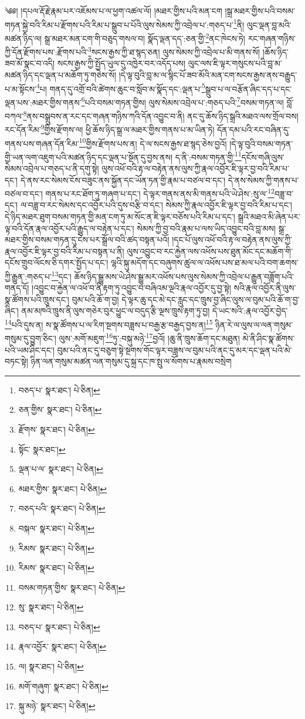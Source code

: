 \setcounter{footnote}{0} 
༄༅། །དཔལ་རྡོ་རྗེ་རྣམ་པར་འཇོམས་པ་ལ་ཕྱག་འཚལ་ལོ། །མཐར་གྱིས་པའི་མན་ངག །སྒྲ་མཐར་གྱིས་པའི་བསམ་གཏན་སྐྱེ་བའི་རིམ་པ་རྫོགས་པའི་རིམ་པ་སྒྲུབ་པ་པོའི་ལུས་སེམས་ཀྱི་འབྲེལ་པ་:གཅད་པ་\footnote{བཅད་པ་  སྣར་ཐང་།  པེ་ཅིན། }ནི། ལུང་ལྡན་བླ་མའི་མཚན་ཉིད་ལ། སྒྲ་མཐར་མན་ངག་གི་བཅུད་གསལ་བ། སྣོད་ལྡན་དད་:ཅན་གྱི་\footnote{ཅན་གྱིས་  སྣར་ཐང་།  པེ་ཅིན། }ནང་ཁེངས་ཏེ། རང་གཞན་གཉིས་ཀྱི་དོན་རྫོགས་པས་:རྫོགས་པའི་\footnote{རྫོགས་  སྣར་ཐང་།  པེ་ཅིན། }སངས་རྒྱས་ཀྱི་ཐ་སྙད་ཅན། ལུས་སེམས་ཀྱི་འབྲེལ་པ་མི་གནས་སོ། །ཆོས་ཉིད་ཟབ་མོ་སྣང་བ་འདི། སངས་རྒྱས་ཀྱི་སྤྱོད་ཡུལ་དུ་འཁྱེར་བར་འདོད་པས། ལུང་ལས་ཇི་ལྟར་གསུངས་པའི་བླ་མ་མཚན་ཉིད་དང་ལྡན་པ་མཆོག་ཏུ་གཅེས་སོ། །དེ་ལྟ་བུའི་བླ་མ་ལ་སྙིང་པོ་ཟབ་མོའི་མན་ངག་སངས་རྒྱས་ནས་བརྒྱུད་པ་མ་སྟོངས་\footnote{སྟོང་  སྣར་ཐང་། }པ། གནད་དུ་འགྲོ་བའི་ཚེགས་ཆུང་བ་སློབ་མ་སྣོད་དང་:ལྡན་པ་\footnote{ལྡན་པ་ལ་  སྣར་ཐང་།  པེ་ཅིན། }སྒྲུབ་པ་ལ་བརྩོན་ཞིང་དད་པ་དང་ལྡན་པས་:མཐར་གྱིས་གནས་\footnote{མཐར་གྱིས་  སྣར་ཐང་།  པེ་ཅིན། }པའི་བསམ་གཏན་གྱིས། ལུས་སེམས་འབྲེལ་པ་:གཅད་པའི་\footnote{བཅད་པའི་  སྣར་ཐང་།  པེ་ཅིན། }བསམ་གཏན་ལ། བློ་བཀལ་\footnote{བསྐལ་  སྣར་ཐང་།  པེ་ཅིན། }ནས་བསྒྲུབས་ན་རང་དང་གཞན་གཉིས་ཀའི་དོན་འབྱུང་བ་ནི། ནང་དུ་ཆོས་ཉིད་སྒྲའི་མཐའ་ལས་གྲོལ་བས། རང་དོན་རིམ་\footnote{རིམས་  སྣར་ཐང་།  པེ་ཅིན། }གྱིས་རྫོགས་ལ། ཕྱི་ཆོས་ཉིད་སྒྲ་ལ་མཐར་གྱིས་གནས་པ་མ་ཡིན་ཏེ། དོན་དམ་པའི་རང་བཞིན་དུ་གནས་པས་གཞན་དོན་རིམ་\footnote{རིམས་  སྣར་ཐང་།  པེ་ཅིན། }གྱིས་རྫོགས་པས་ན། དེ་ལ་སངས་རྒྱས་ཐ་སྙད་ཅེས་བྱའོ། །དེ་ལྟ་བུའི་བསམ་གཏན་གྱི་ཡན་ལག་འཇུག་པའི་མཚན་ཉིད་དང་ལྡན་པ་སྔོན་དུ་བྱས་ནས། ད་ནི་:བསམ་གཏན་གྱི་\footnote{བསམ་གཏན་གྱིས་  སྣར་ཐང་།  པེ་ཅིན། }དངོས་གཞི་ལུས་སེམས་འབྲེལ་པ་གཅད་པ་ནི་དགུ་སྟེ། ལུས་འཕོ་བའི་རྟ་ལ་བརྟེན་ནས་ལུས་ཀྱི་རྣལ་འབྱོར་ཇི་ལྟར་བྱ་བའི་རིམ་པ་དང་། དེ་ནས་རང་སེམས་ངོས་བཟུང་ནས་སྐྱོན་དང་ཡོན་ཏན་གྱི་རྣམ་པ་བཙལ་བ་དང་། དེ་ནས་སེམས་ཀྱི་གནས་པ་བཙལ་བ་དང་། གནས་པ་རང་ཐོག་ཏུ་གཞག་པ་དང་། དེ་ལྟར་གནས་ནས་མི་གནས་པའི་ཡེ་ཤེས་:སུ་ལ་\footnote{སུ་  སྣར་ཐང་།  པེ་ཅིན། }བཟླ་བ་དང་། ལ་བཟླ་བ་རང་སེམས་དང་འབྱོར་པའི་དུས་བརྩི་བ་དང་། སེམས་ཀྱི་རྣལ་འབྱོར་ཇི་ལྟར་བྱ་བའི་རིམ་པ་དང་། དེ་ཉིད་མཐར་ཐུག་བསམ་གཏན་གྱི་མན་ངག་ཏུ་མ་སོང་ན་ཇི་ལྟར་བཅོས་པའི་རིམ་པ་དང་། སྒྲའི་མཐའ་མི་ཞེན་པར་ལྟ་བའི་དོན་རྣལ་འབྱོར་པའི་རྒྱུད་ལ་བརྟེན་པ་དང་། སེམས་ཀྱི་བྱ་བའི་རྣམ་པ་ལས་ཡིད་འབྱུང་བའི་བླ་མས། སྒྲ་མཐར་གྱིས་བསམ་གཏན་དུ་ངེས་པར་སྒྲོལ་བའི་ཚད་བསྟན་པའོ། །དང་པོ་ལུས་འཕོ་བའི་རྟ་ལ་བརྟེན་ནས་ལུས་ཀྱི་རྣལ་འབྱོར་ཇི་ལྟར་བྱ་བའི་རིམ་པ་བསྟན་པ་ནི། ལུས་འབྱུང་བ་རང་རྐྱེན་ལས་འཕོས་པས་ཐུན་མོང་དང་མཆོག་གི་དངོས་གྲུབ་ལོངས་ཅི་དགར་སྤྱོད་པ་དང་། ལྷའི་སྐུ་མདོག་དང་བཞུགས་ཚུལ་ལ་འཕོས་པས་ཐ་མལ་པའི་བག་ཆགས་ཀྱི་རྒྱུན་:གཅད་པ་\footnote{བཅད་པ་  སྣར་ཐང་།  པེ་ཅིན། }དང་། ཆོས་ཉིད་སྒྱུ་མས་ཡེ་ཤེས་སྒྱུ་མར་འཕོས་པས་ལུས་སེམས་ཀྱི་འབྲེལ་པ་རྒྱུན་བཟློག་པའི་གནད་དོ། །འབྱུང་བ་རྐྱེན་ལ་འཕོ་བ་ནི་རྟག་ཏུ་འབྱུང་བ་བཞིའམ་ལྔའི་རྣལ་འབྱོར་དུ་བྱ་སྟེ། སའི་རྣལ་འབྱོར་ནི་ལུས་སྣ་ཚོགས་པའི་ཁྲུས་དང་། བུམ་པའི་ཆོ་ག་བྱ། དེ་ལྟར་ཆུ་དང་མེ་དང་རླུང་དང་ཁྲུས་བྱ་ཞིང་ལུས་ལ་བུམ་པའི་ཆོ་ག་བྱ་ཞིང་། ནམ་མཁའི་ཁྲུས་ནི་ལུས་གཅེར་བུར་ཕྱུང་ལ་བདུད་རྩི་ལྔས་ཁྲུས་རྟག་ཏུ་བྱ། དེ་ཡང་སའི་:རྣལ་འབྱོར་བྱེད་\footnote{རྣལ་འབྱོར་  སྣར་ཐང་།  པེ་ཅིན། }པའི་དུས་ན། ས་སྣ་ཚོགས་པ་ལ་རིག་སྔགས་བཟླས་པ་བརྒྱ་རྩ་བརྒྱད་བྱས་ན།\footnote{ལ།  སྣར་ཐང་།  པེ་ཅིན། } ཉིན་རེ་ལ་ལུས་ལ་ལན་གསུམ་གསུམ་དུ་བྱུག་ཅིང་། ལུས་:མགོ་མཇུག་\footnote{མགོ་གཞུག་  སྣར་ཐང་།  པེ་ཅིན། }ཏུ་:བསྐུ་མཉེ་\footnote{སྐུ་མཉེ་  སྣར་ཐང་།  པེ་ཅིན། }བྱའོ། །ཆུ་ནི་ཁྲུས་ཆོག་དང་མཐུན། མེ་ནི་ཤིང་སྣ་ཚོགས་པའི་ཡམ་ཤིང་དང་། བུམ་པའི་ནང་དུ་བཅུག་སྟེ་སྔགས་གོང་ལྟར་བཟླས་ལ་བུམ་པའི་ནང་དུ་མར་དང་ལྡན་པའི་མེ་བཏང་སྟེ། ཉིན་ལན་གསུམ་མཚན་ལན་གསུམ་དུ་སྐྲ་དང་ཁ་སྤུ་ལ་སོགས་པ་རྣམས་བསྲེག 